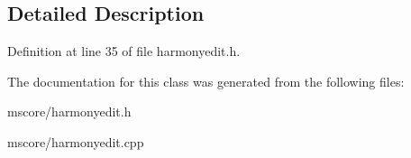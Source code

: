 \subsection{Detailed Description}


Definition at line 35 of file harmonyedit.\+h.



The documentation for this class was generated from the following files\+:\begin{DoxyCompactItemize}
\item 
mscore/harmonyedit.\+h\item 
mscore/harmonyedit.\+cpp\end{DoxyCompactItemize}
